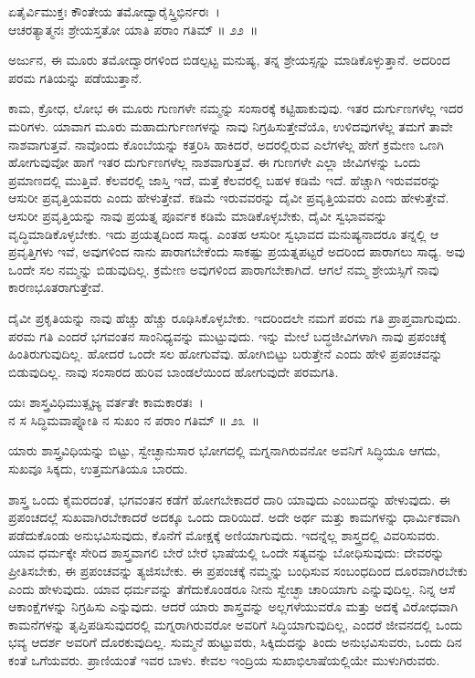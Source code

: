 \begin{shloka}
ಏತೈರ್ವಿಮುಕ್ತಃ ಕೌಂತೇಯ ತಮೋದ್ವಾರೈಸ್ತ್ರಿಭಿರ್ನರಃ~।\\ಆಚರತ್ಯಾತ್ಮನಃ ಶ್ರೇಯಸ್ತತೋ ಯಾತಿ ಪರಾಂ ಗತಿಮ್ \hfill॥ ೨೨~॥
\end{shloka}

\begin{artha}
ಅರ್ಜುನ, ಈ ಮೂರು ತಮೋದ್ವಾರಗಳಿಂದ ಬಿಡಲ್ಪಟ್ಟ ಮನುಷ್ಯ, ತನ್ನ ಶ್ರೇಯಸ್ಸನ್ನು ಮಾಡಿಕೊಳ್ಳುತ್ತಾನೆ. ಅದರಿಂದ ಪರಮ ಗತಿಯನ್ನು ಪಡೆಯುತ್ತಾನೆ.
\end{artha}

ಕಾಮ, ಕ್ರೋಧ, ಲೋಭ ಈ ಮೂರು ಗುಣಗಳೇ ನಮ್ಮನ್ನು ಸಂಸಾರಕ್ಕೆ ಕಟ್ಟಿಹಾಕುವುವು. ಇತರ ದುರ್ಗುಣಗಳೆಲ್ಲ ಇದರ ಮರಿಗಳು. ಯಾವಾಗ ಮೂರು ಮಹಾದುರ್ಗುಣಗಳನ್ನು ನಾವು ನಿಗ್ರಹಿಸುತ್ತೇವೆಯೊ, ಉಳಿದವುಗಳೆಲ್ಲ ತಮಗೆ ತಾವೇ ನಾಶವಾಗುತ್ತವೆ. ನಾವೊಂದು ಕೊಂಬೆಯನ್ನು ಕತ್ತರಿಸಿ ಹಾಕಿದರೆ, ಅದರಲ್ಲಿರುವ ಎಲೆಗಳೆಲ್ಲ ಹೇಗೆ ಕ್ರಮೇಣ ಒಣಗಿ ಹೋಗುವುವೋ ಹಾಗೆ ಇತರ ದುರ್ಗುಣಗಳೆಲ್ಲ ನಾಶವಾಗುತ್ತವೆ. ಈ ಗುಣಗಳೇ ಎಲ್ಲಾ ಜೀವಿಗಳನ್ನು ಒಂದು ಪ್ರಮಾಣದಲ್ಲಿ ಮುತ್ತಿವೆ. ಕೆಲವರಲ್ಲಿ ಜಾಸ್ತಿ ಇದೆ, ಮತ್ತೆ ಕೆಲವರಲ್ಲಿ ಬಹಳ ಕಡಿಮೆ ಇದೆ. ಹೆಚ್ಚಾಗಿ ಇರುವವರನ್ನು ಆಸುರೀ ಪ್ರವೃತ್ತಿಯವರು ಎಂದು ಹೇಳುತ್ತೇವೆ. ಕಡಿಮೆ ಇರುವವರನ್ನು ದೈವೀ ಪ್ರವೃತ್ತಿಯವರು ಎಂದು ಹೇಳುತ್ತೇವೆ. ಆಸುರೀ ಪ್ರವೃತ್ತಿಯನ್ನು ನಾವು ಪ್ರಯತ್ನ ಪೂರ್ವಕ ಕಡಿಮೆ ಮಾಡಿಕೊಳ್ಳಬೇಕು, ದೈವೀ ಸ್ವಭಾವವನ್ನು ವೃದ್ಧಿಮಾಡಿಕೊಳ್ಳಬೇಕು. ಇದು ಪ್ರಯತ್ನದಿಂದ ಸಾಧ್ಯ. ಎಂತಹ ಆಸುರೀ ಸ್ವಭಾವದ ಮನುಷ್ಯನಾದರೂ ತನ್ನಲ್ಲಿ ಆ ಪ್ರವೃತ್ತಿಗಳು ಇವೆ, ಅವುಗಳಿಂದ ನಾನು ಪಾರಾಗಬೇಕೆಂದು ಸಾಕಷ್ಟು ಪ್ರಯತ್ನಪಟ್ಟರೆ ಅದರಿಂದ ಪಾರಾಗಲು ಸಾಧ್ಯ. ಅವು ಒಂದೇ ಸಲ ನಮ್ಮನ್ನು ಬಿಡುವುದಿಲ್ಲ. ಕ್ರಮೇಣ ಅವುಗಳಿಂದ ಪಾರಾಗಬೇಕಾಗಿದೆ. ಆಗಲೆ ನಮ್ಮ ಶ್ರೇಯಸ್ಸಿಗೆ ನಾವು ಕಾರಣಭೂತರಾಗುತ್ತೇವೆ.

ದೈವೀ ಪ್ರಕೃತಿಯನ್ನು ನಾವು ಹೆಚ್ಚು ಹೆಚ್ಚು ರೂಢಿಸಿಕೊಳ್ಳಬೇಕು. ಇದರಿಂದಲೇ ನಮಗೆ ಪರಮ ಗತಿ ಪ್ರಾಪ್ತವಾಗುವುದು. ಪರಮ ಗತಿ ಎಂದರೆ ಭಗವಂತನ ಸಾಂನಿಧ್ಯವನ್ನು ಮುಟ್ಟುವುದು. ಇನ್ನು ಮೇಲೆ ಬದ್ಧಜೀವಿಗಳಾಗಿ ನಾವು ಪ್ರಪಂಚಕ್ಕೆ ಹಿಂತಿರುಗುವುದಿಲ್ಲ. ಹೋದರೆ ಒಂದೇ ಸಲ ಹೋಗುವೆವು. ಹೋಗಿಬಿಟ್ಟು ಬರುತ್ತೇನೆ ಎಂದು ಹೇಳಿ ಪ್ರಪಂಚವನ್ನು ಬಿಡುವುದಿಲ್ಲ. ನಾವು ಸಂಸಾರದ ಹುರಿವ ಬಾಂಡಲೆಯಿಂದ ಹೋಗುವುದೇ ಪರಮಗತಿ.

\begin{shloka}
ಯಃ ಶಾಸ್ತ್ರವಿಧಿಮುತ್ಸೃಜ್ಯ ವರ್ತತೇ ಕಾಮಕಾರತಃ~।\\ನ ಸ ಸಿದ್ಧಿಮವಾಪ್ನೋತಿ ನ ಸುಖಂ ನ ಪರಾಂ ಗತಿಮ್ \hfill॥ ೨೩~॥
\end{shloka}

\begin{artha}
ಯಾರು ಶಾಸ್ತ್ರವಿಧಿಯನ್ನು ಬಿಟ್ಟು, ಸ್ವೇಚ್ಛಾನುಸಾರ ಭೋಗದಲ್ಲಿ ಮಗ್ನನಾಗಿರುವನೋ ಅವನಿಗೆ ಸಿದ್ಧಿಯೂ ಆಗದು, ಸುಖವೂ ಸಿಕ್ಕದು, ಉತ್ತಮಗತಿಯೂ ಬಾರದು.
\end{artha}

\newpage

ಶಾಸ್ತ್ರ ಒಂದು ಕೈಮರದಂತೆ, ಭಗವಂತನ ಕಡೆಗೆ ಹೋಗಬೇಕಾದರೆ ದಾರಿ ಯಾವುದು ಎಂಬುದನ್ನು ಹೇಳುವುದು. ಈ ಪ್ರಪಂಚದಲ್ಲೆ ಸುಖವಾಗಿರಬೇಕಾದರೆ ಅದಕ್ಕೂ ಒಂದು ದಾರಿ\-ಯಿದೆ. ಅದೇ ಅರ್ಥ ಮತ್ತು ಕಾಮಗಳನ್ನು ಧಾರ್ಮಿಕವಾಗಿ ಪಡೆದುಕೊಂಡು ಅನುಭವಿಸುವುದು, ಕೊನೆಗೆ ಮೋಕ್ಷಕ್ಕೆ ಅಣಿಯಾಗುವುದು. ಇದನ್ನೆಲ್ಲ ಶಾಸ್ತ್ರದಲ್ಲಿ ವಿವರಿಸುವರು. ಯಾವ ಧರ್ಮಕ್ಕೇ ಸೇರಿದ ಶಾಸ್ತ್ರವಾಗಲಿ ಬೇರೆ ಬೇರೆ ಭಾಷೆಯಲ್ಲಿ ಒಂದೇ ಸತ್ಯವನ್ನು ಬೋಧಿಸುವುದು: ದೇವರನ್ನು ಪ್ರೀತಿಸಬೇಕು, ಈ ಪ್ರಪಂಚವನ್ನು ತ್ಯಜಿಸಬೇಕು. ಈ ಪ್ರಪಂಚಕ್ಕೆ ನಮ್ಮನ್ನು ಬಂಧಿಸುವ ಸಂಬಂಧದಿಂದ ದೂರವಾಗಿರಬೇಕು ಎಂದು ಹೇಳುವುದು. ಯಾವ ಧರ್ಮವನ್ನು ತೆಗೆದುಕೊಂಡರೂ ನೀನು ಸ್ವೇಚ್ಛಾ ಚಾರಿಯಾಗು ಎನ್ನುವುದಿಲ್ಲ. ನಿನ್ನ ಆಸೆ ಆಕಾಂಕ್ಷೆಗಳನ್ನು ನಿಗ್ರಹಿಸು ಎನ್ನುವುದು. ಆದರೆ ಯಾರು ಶಾಸ್ತ್ರವನ್ನು ಅಲ್ಲಗಳೆಯುವರೊ ಮತ್ತು ಅದಕ್ಕೆ ವಿರೋಧವಾಗಿ ಕಾಮನೆಗಳನ್ನು ತೃಪ್ತಿಪಡಿಸುವುದರಲ್ಲಿ ಮಗ್ನರಾಗಿರುವರೋ ಅವರಿಗೆ ಸಿದ್ಧಿಯಾಗುವುದಿಲ್ಲ, ಎಂದರೆ ಜೀವನದಲ್ಲಿ ಒಂದು ಭವ್ಯ ಆದರ್ಶ ಅವರಿಗೆ ದೊರಕುವುದಿಲ್ಲ. ಸುಮ್ಮನೆ ಹುಟ್ಟುವರು, ಸಿಕ್ಕಿದುದನ್ನು ತಿಂದು ಅನುಭವಿಸುವರು, ಒಂದು ದಿನ ಕಂತೆ ಒಗೆಯವರು. ಪ್ರಾಣಿಯಂತೆ ಇವರ ಬಾಳು. ಕೇವಲ ಇಂದ್ರಿಯ ಸುಖಾಭಿಲಾಷೆಯಲ್ಲಿಯೇ ಮುಳುಗಿರುವರು.


